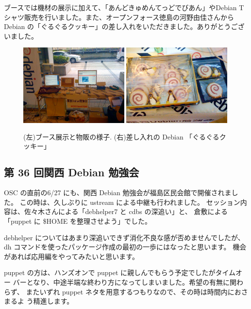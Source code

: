 \documentclass[mingoth,a4paper]{jsarticle}
\begin{document}
ブースでは機材の展示に加えて、「あんどきゅめんてっどでびあん」やDebian T
シャツ販売を行いました。また、オープンフォース徳島の河野由佳さんから
Debian の「ぐるぐるクッキー」の差し入れをいただきました。ありがとうござ
いました。

\begin{figure}[h]
    \centering
    \includegraphics[width=0.49\textwidth]{image201008/osckyoto1.jpg}
    \includegraphics[width=0.49\textwidth]{image201008/osckyoto2.jpg}    
    \caption{(左)ブース展示と物販の様子. %
      (右)差し入れの Debian 「ぐるぐるクッキー」}
\end{figure}

\subsection{第 36 回関西 Debian 勉強会}

OSC の直前の6/27 にも、関西 Debian 勉強会が福島区民会館で開催されました。
この時は、久しぶりに ustream による中継も行われました。
%
セッション内容は、佐々木さんによる「debhelper7 と cdbs の深追い」と、
倉敷による「puppet に \$HOME を整理させよう」でした。

debhelper についてはあまり深追いできず消化不良な感が否めませんでしたが、
dh コマンドを使ったパッケージ作成の最初の一歩にはなったと思います。%
機会があれば応用編をやってみたいと思います。

puppet の方は、ハンズオンで puppet に親しんでもらう予定でしたがタイムオー
バーとなり、中途半端な終わり方になってしまいました。希望の有無に関わらず、
またいずれ puppet ネタを用意するつもりなので、その時は時間内におさまるよ
う精進します。
\end{document}
